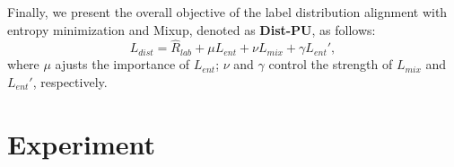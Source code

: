 \documentclass[final]{cvpr}
\begin{document}
Finally, we present the overall objective of the label distribution alignment with entropy minimization and Mixup, denoted as \textbf{Dist-PU}, as follows:
\begin{equation}
    L_{dist} = \hat{R}_{lab} + \mu L_{ent} + \nu L_{mix} + \gamma L_{ent}', \label{eq:final_obj}
\end{equation}
where $\mu$ ajusts the importance of $L_{ent}$; $\nu$ and $\gamma$ control the strength of $L_{mix}$ and $L_{ent}'$, respectively.

\section{Experiment}

\begin{table}[htp]\small
  \centering
  \caption{Summary of used datasets and their corresponding models.}
  \label{tab:dataset}%
\end{table}%
\end{document}
